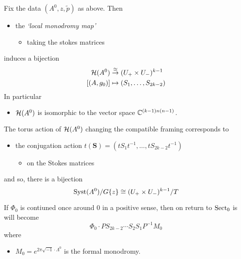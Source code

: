 \begin{thm}
  Fix the data $(A^0,z,\tilde p)$ as above.
  Then 
  \begin{itemize}
    \item the \emph{`local monodromy map'}
      \begin{itemize}
        \item taking the stokes matrices
      \end{itemize}
  \end{itemize}
  induces a bijection
  \begin{align*}
    \mathcal{H}(A^0)&\overset{\cong}{\to}(U_+\times U_-)^{k-1}
  \\ \left[(A,g_0)\right] &\mapsto(S_1,\dots,S_{2k-2})
  \end{align*}
  In particular
  \begin{itemize}
    \item $\mathcal{H}(A^0)$ is isomorphic to the vector space $\mathbb{C}^{(k-1)n(n-1)}$.
  \end{itemize}

  \begin{cor}
    The torus action of $\mathcal{H}(A^0)$ changing the compatible framing
    corresponds to
    \begin{itemize}
      \item the conjugation action
        $t(\textbf{S})=(tS_1t^{-1},\dots,tS_{2k-2}t^{-1})$
        \begin{itemize}
          \item on the Stokes matrices
        \end{itemize}
    \end{itemize}
    and so, there is a bijection
    \[
      \operatorname{Syst}(A^0)/G\{z\}\cong(U_+\times U_-)^{k-1}/T
    \]
  \end{cor}
  \begin{cor}
    If $\Phi_0$ is contiuned once around $0$ in a positive sense, then on
    return to $\operatorname{Sect}_0$ is will become
    \[
      \Phi_0\cdot PS_{2k-2}\cdots S_2S_1P^{-1}M_0
    \]
    where
    \begin{itemize}
      \item $M_0=e^{2\pi\sqrt{-1}\cdot\Lambda^0}$ is the formal monodromy.
    \end{itemize}
  \end{cor}
\end{thm}


